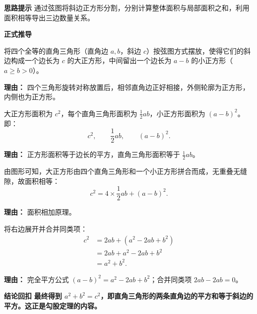 \begin{proofbox}
	\textbf{\textcolor{CProof}{思路提示}}
	通过弦图将斜边正方形分割，分别计算整体面积与局部面积之和，利用面积相等导出三边数量关系。

	\medskip
	\textbf{\textcolor{CProof}{正式推导}}
	\begin{description}[style=nextline, leftmargin=2.8em, labelsep=0.5em, itemsep=0.55em]
		\item[\textbf{步骤一（构造图形）：}]
			将四个全等的直角三角形（直角边 $a,b$，斜边 $c$）按弦图方式摆放，使得它们的斜边构成一个边长为 $c$ 的大正方形，中间留出一个边长为 $a-b$ 的小正方形（$a\ge b>0$）。
			\par\textbf{理由：} 四个三角形旋转对称放置后，相邻直角边正好相接，外侧轮廓为正方形，内侧也为正方形。
		\item[\textbf{步骤二（面积计算）：}]
			大正方形面积为 $c^2$，每个直角三角形面积为 $\frac12 ab$，小正方形面积为 $(a-b)^2$。即：
			\[
				c^2,
				\qquad
				\frac12 ab,
				\qquad
				(a-b)^2 .
			\]
			\par\textbf{理由：} 正方形面积等于边长的平方，直角三角形面积等于 $\frac12 ab$。
		\item[\textbf{步骤三（建立等式）：}]
			由图形可知，大正方形由四个直角三角形和一个小正方形拼合而成，无重叠无缝隙，故面积相等：
			\[
				c^2 = 4 \times \frac12 ab + (a-b)^2 .
			\]
			\par\textbf{理由：} 面积相加原理。
		\item[\textbf{步骤四（代数化简）：}]
			将右边展开并合并同类项：
			\[
				\begin{aligned}
					c^2 &= 2ab + (a^2 - 2ab + b^2) \\ &= 2ab + a^2 - 2ab + b^2 \\ &= a^2 + b^2 .
			\end{aligned}
			\]
			\par\textbf{理由：} 完全平方公式 $(a-b)^2 = a^2-2ab+b^2$；合并同类项 $2ab-2ab=0$。
	\end{description}

	\medskip
	\textbf{\textcolor{CProof}{结论回扣}}
	\textbf{最终得到 $a^2+b^2=c^2$，即直角三角形的两条直角边的平方和等于斜边的平方。这正是勾股定理的内容。}
\end{proofbox}
